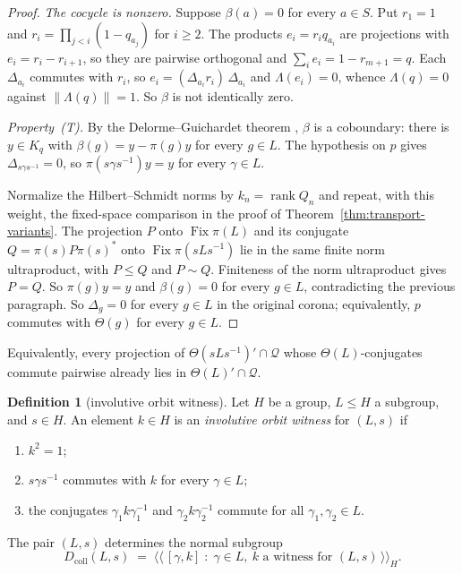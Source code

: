 \documentclass[11pt]{amsart}
\newcommand{\leanverified}[2]{\ignorespaces}
\theoremstyle{definition}
\newtheorem{definition}[theorem]{Definition}
\theoremstyle{remark}
\theoremstyle{plain}
\begin{document}
\begin{proof}
\emph{The cocycle is nonzero.}  Suppose $\beta(a)=0$ for every $a\in S$.  Put $r_1=1$ and
$r_i=\prod_{j<i}(1-q_{a_j})$ for $i\ge2$.  The products
$e_i=r_iq_{a_i}$ are projections with $e_i=r_i-r_{i+1}$, so they are
pairwise orthogonal and $\sum_ie_i=1-r_{m+1}=q$.  Each $\Delta_{a_i}$
commutes with $r_i$, so $e_i=(\Delta_{a_i}r_i)\,\Delta_{a_i}$ and
$\Lambda(e_i)=0$, whence $\Lambda(q)=0$ against
$\lVert\Lambda(q)\rVert=1$.  So $\beta$ is not identically zero.

\emph{Property~\textup{(T)}.}  By the Delorme--Guichardet theorem
\cite{Delorme,Guichardet}, $\beta$ is a coboundary: there is $y\in K_q$
with $\beta(g)=y-\pi(g)y$ for every $g\in L$.  The hypothesis on $p$
gives $\Delta_{s\gamma s^{-1}}=0$, so
$\pi(s\gamma s^{-1})y=y$ for every $\gamma\in L$.

Normalize the Hilbert--Schmidt norms by $k_n=\operatorname{rank}Q_n$
and repeat, with this weight, the fixed-space
comparison in the proof of Theorem~\ref{thm:transport-variants}.  The
projection $P$ onto $\operatorname{Fix}\pi(L)$ and its conjugate
$Q=\pi(s)P\pi(s)^{*}$ onto
$\operatorname{Fix}\pi(sLs^{-1})$ lie in the same finite norm
ultraproduct, with $P\le Q$ and $P\sim Q$.  Finiteness of the norm
ultraproduct gives $P=Q$.  So $\pi(g)y=y$ and
$\beta(g)=0$ for every $g\in L$, contradicting the previous paragraph.
So $\Delta_g=0$ for every $g\in L$ in the original corona; equivalently,
$p$ commutes with $\Theta(g)$ for every $g\in L$.
\end{proof}

Equivalently, every projection of $\Theta(sLs^{-1})'\cap\mathcal Q$
whose $\Theta(L)$-conjugates commute pairwise already lies in
$\Theta(L)'\cap\mathcal Q$.

\begin{definition}[involutive orbit witness]\label{def:invwitness}
Let $H$ be a group, $L\le H$ a subgroup, and $s\in H$.  An element
$k\in H$ is an \emph{involutive orbit witness} for $(L,s)$ if
\begin{enumerate}
\item[(W1)] $k^2=1$;
\item[(W2)] $s\gamma s^{-1}$ commutes with $k$ for every $\gamma\in L$;
\item[(W3)] the conjugates $\gamma_1k\gamma_1^{-1}$ and
  $\gamma_2k\gamma_2^{-1}$ commute for all $\gamma_1,\gamma_2\in L$.
\end{enumerate}
The pair $(L,s)$ determines the normal subgroup
\leanverified{Sofic/ManuscriptExactWrappers}{GroupApproximation.ManuscriptExactWrappers.manuscriptInvolutiveCollapsePattern}
\[
  D_{\mathrm{coll}}(L,s)
  \;=\;
  \bigl\langle\!\bigl\langle\,
  [\gamma,k]\;:\;\gamma\in L,\
  k\text{ a witness for }(L,s)
  \,\bigr\rangle\!\bigr\rangle_H .
\]
\end{definition}
\end{document}
